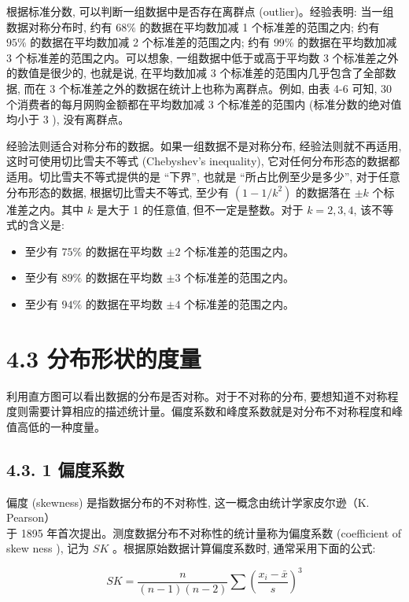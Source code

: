 \documentclass[10pt]{article}
\begin{document}
\begin{CJK*}{UTF8}{bsmi}
根据标准分数, 可以判断一组数据中是否存在离群点 (outlier)。经验表明: 当一组数据对称分布时, 约有 $68 \%$ 的数据在平均数加减 1 个标准差的范围之内; 约有 $95 \%$ 的数据在平均数加减 2 个标准差的范围之内; 约有 $99 \%$ 的数据在平均数加减 3 个标准差的范围之内。可以想象, 一组数据中低于或高于平均数 3 个标准差之外的数值是很少的, 也就是说, 在平均数加减 3 个标准差的范围内几乎包含了全部数据, 而在 3 个标准差之外的数据在统计上也称为离群点。例如, 由表 4-6 可知, 30 个消费者的每月网购金额都在平均数加减 3 个标准差的范围内 (标准分数的绝对值均小于 3 ), 没有离群点。

经验法则适合对称分布的数据。如果一组数据不是对称分布, 经验法则就不再适用,这时可使用切比雪夫不等式 (Chebyshev's inequality), 它对任何分布形态的数据都适用。切比雪夫不等式提供的是 “下界”, 也就是 “所占比例至少是多少”, 对于任意分布形态的数据, 根据切比雪夫不等式, 至少有 $\left(1-1 / k^{2}\right)$ 的数据落在 $\pm k$ 个标准差之内。其中 $k$ 是大于 1 的任意值, 但不一定是整数。对于 $k=2,3,4$, 该不等式的含义是:

\begin{itemize}
  \item 至少有 $75 \%$ 的数据在平均数 $\pm 2$ 个标准差的范围之内。
  \item 至少有 $89 \%$ 的数据在平均数 $\pm 3$ 个标准差的范围之内。
  \item 至少有 $94 \%$ 的数据在平均数 $\pm 4$ 个标准差的范围之内。
\end{itemize}

\section*{4.3 分布形状的度量}
利用直方图可以看出数据的分布是否对称。对于不对称的分布, 要想知道不对称程度则需要计算相应的描述统计量。偏度系数和峰度系数就是对分布不对称程度和峰值高低的一种度量。

\subsection*{4.3. 1 偏度系数}
偏度 (skewness) 是指数据分布的不对称性, 这一概念由统计学家皮尔逊（K. Pearson）\\
于 1895 年首次提出。测度数据分布不对称性的统计量称为偏度系数 (coefficient of skew ness ), 记为 $S K$ 。根据原始数据计算偏度系数时, 通常采用下面的公式:


\begin{equation*}
S K=\frac{n}{(n-1)(n-2)} \sum\left(\frac{x_{i}-\bar{x}}{s}\right)^{3} \tag{4.17}
\end{equation*}



\end{CJK*}
\end{document}

